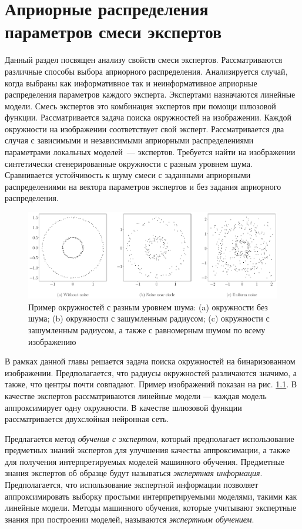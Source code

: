 \chapter{Априорные распределения параметров смеси экспертов}

Данный раздел посвящен анализу свойств смеси экспертов. Рассматриваются различные способы выбора априорного распределения. Анализируется случай, когда выбраны как информативное так и неинформативное априорные распределения параметров каждого эксперта. Экспертами назначаются линейные модели. Смесь экспертов это комбинация экспертов при помощи шлюзовой функции. Рассматривается задача поиска окружностей на изображении. Каждой окружности на изображении соответствует свой эксперт. Рассматривается два случая с зависимыми и независимыми априорными распределениями параметрами локальных моделей~--- экспертов. Требуется найти на изображении синтетически сгенерированные окружности с разным уровнем шума. Сравнивается устойчивость к шуму смеси с заданными априорными распределениями на вектора параметров экспертов и без задания априорного распределения.

\begin{figure}[!ht]\center
\includegraphics[width=1\textwidth]{results/priorexpert/statment}
\caption{Пример окружностей с разным уровнем шума: (a) окружности без шума; (b) окружности с зашумленным радиусом; (c) окружности с зашумленным радиусом, а также с равномерным шумом по всему изображению}
\label{example-exp:1}
\end{figure}

В рамках данной главы решается задача поиска окружностей на бинаризованном изображении. Предполагается, что радиусы окружностей различаются значимо, а также, что центры почти совпадают. Пример изображений показан на рис. \ref{example-exp:1}. В качестве экспертов рассматриваются линейные модели --- каждая модель аппроксимирует одну окружности. В качестве шлюзовой функции рассматривается двухслойная нейронная сеть.

Предлагается метод \textit{обучения с экспертом}, который предполагает использование предметных знаний экспертов для улучшения качества аппроксимации, а также для получения интерпретируемых моделей машинного обучения.
Предметные знания экспертов об образце будут называться \textit{экспертная информация}.
Предполагается, что использование экспертной информации позволяет аппроксимировать выборку простыми интерпретируемыми моделями, такими как линейные модели. Методы машинного обучения, которые учитывают экспертные знания при построении моделей, называются \textit{экспертным обучением}.

